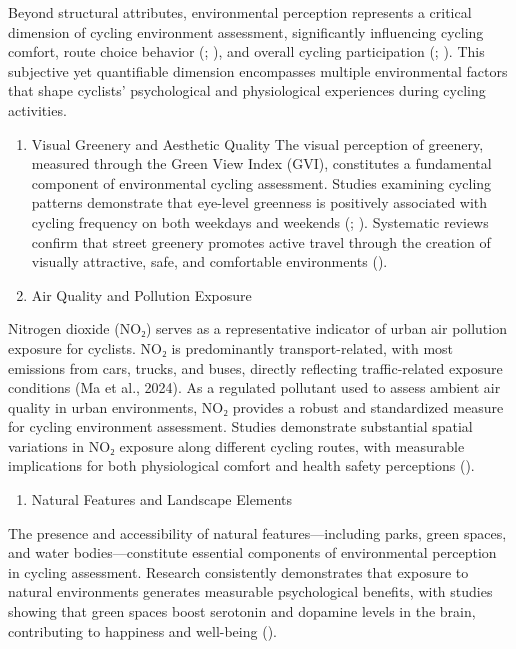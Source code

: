 \documentclass[
  12pt,
  oneside]{book}
\providecommand{\tightlist}{%
  \setlength{\itemsep}{0pt}\setlength{\parskip}{0pt}}
\begin{document}
Beyond structural attributes, environmental perception represents a critical dimension of cycling environment assessment, significantly influencing cycling comfort, route choice behavior (\textcite{broach_where_2012}; \textcite{sener_analysis_2009}), and overall cycling participation (\textcite{winters_motivators_2011}; \textcite{aldred_investigating_2015}). This subjective yet quantifiable dimension encompasses multiple environmental factors that shape cyclists' psychological and physiological experiences during cycling activities.

\begin{enumerate}
\def\labelenumi{\arabic{enumi}.}
\item
  Visual Greenery and Aesthetic Quality
  The visual perception of greenery, measured through the Green View Index (GVI), constitutes a fundamental component of environmental cycling assessment. Studies examining cycling patterns demonstrate that eye-level greenness is positively associated with cycling frequency on both weekdays and weekends (\textcite{lu_effect_2018}; \textcite{bai_exploring_2023}). Systematic reviews confirm that street greenery promotes active travel through the creation of visually attractive, safe, and comfortable environments (\textcite{nieuwenhuijsen_fifty_2017}).
\item
  Air Quality and Pollution Exposure
\end{enumerate}

Nitrogen dioxide (NO₂) serves as a representative indicator of urban air pollution exposure for cyclists. NO₂ is predominantly transport-related, with most emissions from cars, trucks, and buses, directly reflecting traffic-related exposure conditions (Ma et al., 2024). As a regulated pollutant used to assess ambient air quality in urban environments, NO₂ provides a robust and standardized measure for cycling environment assessment. Studies demonstrate substantial spatial variations in NO₂ exposure along different cycling routes, with measurable implications for both physiological comfort and health safety perceptions (\textcite{an_impact_2018}).

\begin{enumerate}
\def\labelenumi{\arabic{enumi}.}
\setcounter{enumi}{2}
\tightlist
\item
  Natural Features and Landscape Elements
\end{enumerate}

The presence and accessibility of natural features---including parks, green spaces, and water bodies---constitute essential components of environmental perception in cycling assessment. Research consistently demonstrates that exposure to natural environments generates measurable psychological benefits, with studies showing that green spaces boost serotonin and dopamine levels in the brain, contributing to happiness and well-being (\textcite{lee_health_2011}).
\end{document}
